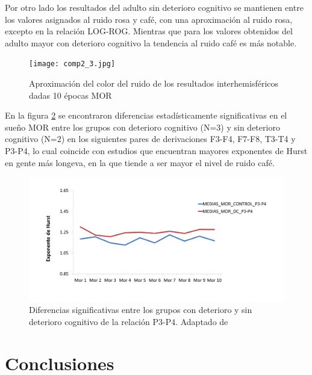 \documentclass[letterpaper,titlepage,12pt,draft]{report}
\begin{document}
Por otro lado los resultados del adulto sin deterioro cognitivo se mantienen entre los valores asignados al ruido rosa y caf\'e, con una aproximaci\'on al ruido rosa, excepto en la relaci\'on LOG-ROG. Mientras que para los valores obtenidos del adulto mayor con deterioro cognitivo la tendencia al ruido caf\'e es m\'as notable.\\

\begin{figure}[H]
\centering
\texttt{[image: comp2\_3.jpg]}
\caption{Aproximaci\'on del color del ruido de los resultados interhemisf\'ericos dadas 10 \'epocas MOR}
\label{fig:c3}
\end{figure}

En la figura \ref{fig:c4} se encontraron diferencias estad\'isticamente significativas en el sue\~no MOR entre los grupos con deterioro cognitivo (N=3) y sin deterioro cognitivo (N=2) en los siguientes pares de derivaciones F3-F4, F7-F8, T3-T4 y P3-P4, lo cual coincide con estudios que encuentran mayores exponentes de Hurst en gente m\'as longeva, en la que tiende a ser mayor el nivel de ruido caf\'e.
\begin{figure}[H]
\centering
\includegraphics[scale=0.5]{com.png}
\caption{Diferencias significativas entre los grupos con deterioro y sin deterioro cognitivo de la relaci\'on P3-P4. Adaptado de \cite{Genesis}}
\label{fig:c4}
\end{figure}


\chapter{Conclusiones}
\end{document}
